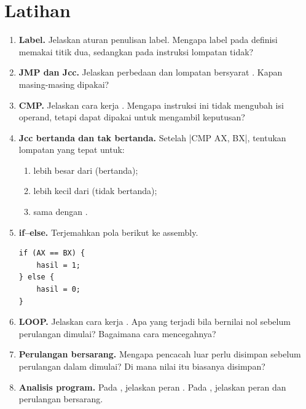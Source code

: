 \section{Latihan}
\label{sec:latihan-bab13}

\begin{enumerate}
    \item \textbf{Label.} Jelaskan aturan penulisan label. Mengapa
          label pada definisi memakai titik dua, sedangkan pada
          instruksi lompatan tidak?

    \item \textbf{JMP dan Jcc.} Jelaskan perbedaan  dan
          lompatan bersyarat . Kapan masing-masing dipakai?

    \item \textbf{CMP.} Jelaskan cara kerja . Mengapa
          instruksi ini tidak mengubah isi operand, tetapi dapat
          dipakai untuk mengambil keputusan?

    \item \textbf{Jcc bertanda dan tak bertanda.} Setelah
          \lstasm|CMP AX, BX|, tentukan lompatan yang tepat untuk:
          \begin{enumerate}
              \item {} lebih besar dari  (bertanda);
              \item {} lebih kecil dari  (tidak
                    bertanda);
              \item {} sama dengan .
          \end{enumerate}

    \item \textbf{if--else.} Terjemahkan pola berikut ke assembly.
          \begin{lstlisting}[language=MASM, numbers=none]
if (AX == BX) {
    hasil = 1;
} else {
    hasil = 0;
}
          \end{lstlisting}

    \item \textbf{LOOP.} Jelaskan cara kerja . Apa yang
          terjadi bila  bernilai nol sebelum perulangan
          dimulai? Bagaimana cara mencegahnya?

    \item \textbf{Perulangan bersarang.} Mengapa pencacah luar perlu
          disimpan sebelum perulangan dalam dimulai? Di mana nilai
          itu biasanya disimpan?

    \item \textbf{Analisis program.} Pada ,
          jelaskan peran . Pada ,
          jelaskan peran  dan perulangan bersarang.
\end{enumerate}

